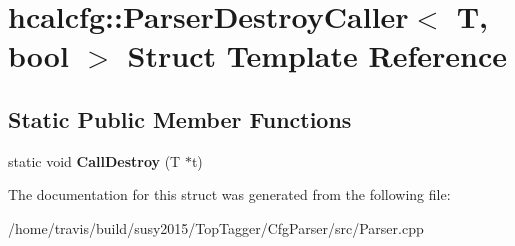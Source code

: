 \hypertarget{structhcalcfg_1_1ParserDestroyCaller}{\section{hcalcfg\-:\-:Parser\-Destroy\-Caller$<$ T, bool $>$ Struct Template Reference}
\label{structhcalcfg_1_1ParserDestroyCaller}
}
\subsection*{Static Public Member Functions}
\begin{DoxyCompactItemize}
\item 
\hypertarget{structhcalcfg_1_1ParserDestroyCaller_a7b6573874f65985b4a1a5d5cb1a5e449}{static void {\bfseries Call\-Destroy} (T $\ast$t)}\label{structhcalcfg_1_1ParserDestroyCaller_a7b6573874f65985b4a1a5d5cb1a5e449}

\end{DoxyCompactItemize}


The documentation for this struct was generated from the following file\-:\begin{DoxyCompactItemize}
\item 
/home/travis/build/susy2015/\-Top\-Tagger/\-Cfg\-Parser/src/Parser.\-cpp\end{DoxyCompactItemize}
